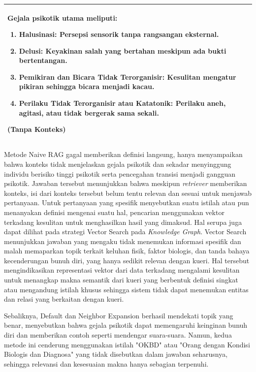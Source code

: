 \begin{longtable}{|p{2cm}|p{11cm}|}
\begin{minipage}[t]{10cm}
		Gejala psikotik utama meliputi:
		\begin{enumerate}
			\item \textbf{Halusinasi:} Persepsi sensorik tanpa rangsangan eksternal.
			\item \textbf{Delusi:} Keyakinan salah yang bertahan meskipun ada bukti bertentangan.
			\item \textbf{Pemikiran dan Bicara Tidak Terorganisir:} Kesulitan mengatur pikiran sehingga bicara menjadi kacau.
			\item \textbf{Perilaku Tidak Terorganisir atau Katatonik:} Perilaku aneh, agitasi, atau tidak bergerak sama sekali.
		\end{enumerate}
		(\textbf{Tanpa Konteks})
		\vspace{0.5em}
	\end{minipage}                                                                                                                                          \\
	\hline
\end{longtable}

Metode Naive RAG gagal memberikan definisi langsung, hanya menyampaikan bahwa konteks tidak menjelaskan gejala psikotik dan sekadar menyinggung individu berisiko tinggi psikotik serta pencegahan transisi menjadi gangguan psikotik.
Jawaban tersebut menunjukkan bahwa meskipun \textit{retriever} memberikan konteks, isi dari konteks tersebut belum tentu relevan dan sesuai untuk menjawab pertanyaan.
Untuk pertanyaan yang spesifik menyebutkan suatu istilah atau pun menanyakan definisi mengenai suatu hal, pencarian menggunakan vektor terkadang kesulitan untuk menghasilkan hasil yang dimaksud.
Hal serupa juga dapat dilihat pada strategi Vector Search pada \textit{Knowledge Graph}.
Vector Search menunjukkan jawaban yang mengaku tidak menemukan informasi spesifik dan malah memaparkan topik terkait keluhan fisik, faktor biologis, dan tanda bahaya kecenderungan bunuh diri, yang hanya sedikit relevan dengan kueri.
Hal tersebut mengindikasikan representasi vektor dari data terkadang mengalami kesulitan untuk menangkap makna semantik dari kueri yang berbentuk definisi singkat atau mengandung istilah khusus sehingga sistem tidak dapat menemukan entitas dan relasi yang berkaitan dengan kueri.

Sebaliknya, Default dan Neighbor Expansion berhasil mendekati topik yang benar, menyebutkan bahwa gejala psikotik dapat memengaruhi keinginan bunuh diri dan memberikan contoh seperti mendengar suara-suara.
Namun, kedua metode ini cenderung menggunakan istilah "OKBD" atau "Orang dengan Kondisi Biologis dan Diagnosa" yang tidak disebutkan dalam jawaban seharusnya, sehingga relevansi dan kesesuaian makna hanya sebagian terpenuhi.

